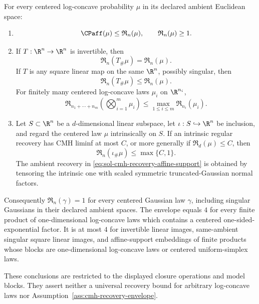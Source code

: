\documentclass[../main.tex]{subfiles}
\begin{document}
\begin{theorem}
\label{thm:sol-cmh-recovery-calculus}
For every centered log-concave probability $\mu$ in its declared ambient Euclidean space:
\begin{enumerate}[label=(\roman*),leftmargin=2.8em]
  \item
  \begin{equation}
    \CPaff(\mu)\le \mathfrak R_n(\mu),
    \qquad \mathfrak R_n(\mu)\ge1.
    \label{eq:sol-cmh-recovery-lower-bounds}
  \end{equation}
  \item If $T:\R^n\to\R^n$ is invertible, then
  \begin{equation}
    \mathfrak R_n(T_\#\mu)=\mathfrak R_n(\mu).
    \label{eq:sol-cmh-recovery-invertible}
  \end{equation}
  If $T$ is any square linear map on the same $\R^n$, possibly singular, then
  \begin{equation}
    \mathfrak R_n(T_\#\mu)\le\mathfrak R_n(\mu).
    \label{eq:sol-cmh-recovery-singular}
  \end{equation}
  For finitely many centered log-concave laws $\mu_i$ on $\R^{n_i}$,
  \begin{equation}
    \mathfrak R_{n_1+\cdots+n_m}
       \left(\bigotimes_{i=1}^m\mu_i\right)
    \le\max_{1\le i\le m}\mathfrak R_{n_i}(\mu_i).
    \label{eq:sol-cmh-recovery-product}
  \end{equation}
  \item Let $S\subset\R^n$ be a $d$-dimensional linear subspace, let
  $\iota:S\hookrightarrow\R^n$ be inclusion, and regard the centered law $\mu$ intrinsically
  on $S$.  If an intrinsic regular recovery has CMH liminf at most $C$, or more generally if
  $\mathfrak R_d(\mu)\le C$, then
  \begin{equation}
    \mathfrak R_n(\iota_\#\mu)\le\max\{C,1\}.
    \label{eq:sol-cmh-recovery-affine-support}
  \end{equation}
  The ambient recovery in \eqref{eq:sol-cmh-recovery-affine-support} is obtained by tensoring
  the intrinsic one with scaled symmetric truncated-Gaussian normal factors.
\end{enumerate}
Consequently $\mathfrak R_n(\gamma)=1$ for every centered Gaussian law $\gamma$, including
singular Gaussians in their declared ambient spaces.  The envelope equals $4$ for every finite
product of one-dimensional log-concave laws which contains a centered one-sided-exponential
factor.  It is at most $4$ for invertible linear images, same-ambient singular square linear
images, and affine-support embeddings of finite products whose blocks are one-dimensional
log-concave laws or centered uniform-simplex laws.

These conclusions are restricted to the displayed closure operations and model blocks.  They
assert neither a universal recovery bound for arbitrary log-concave laws nor
Assumption~\ref{ass:cmh-recovery-envelope}.
\end{theorem}
\end{document}
